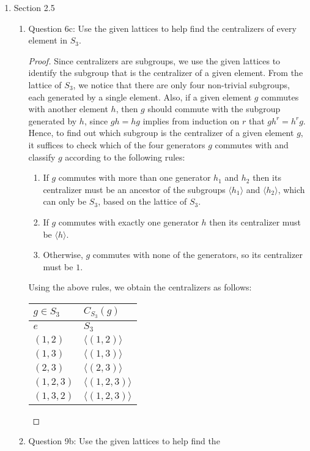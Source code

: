 \documentclass{article}
\begin{document}
\begin{enumerate}
  \item Section 2.5
    \begin{enumerate}
      \item Question 6c: Use the given lattices to help find the
        centralizers of every element in $S_3$.
        \begin{proof}
          Since centralizers are subgroups, we use the given lattices to
          identify the subgroup that is the centralizer of a given element.
          From the lattice of $S_3$, we notice that there are only four
          non-trivial subgroups, each generated by a single element. Also,
          if a given element $g$ commutes with another element $h$, then
          $g$ should commute with the subgroup generated by $h$, since
          $gh=hg$ implies from induction on $r$ that $gh^r=h^rg$. Hence, to
          find out which subgroup is the centralizer of a given element
          $g$, it suffices to check which of the four generators $g$
          commutes with and classify $g$ according to the following rules:
          \begin{enumerate}
            \item If $g$ commutes with more than one generator $h_1$ and
              $h_2$ then its centralizer must be an ancestor of the
              subgroups $\langle h_1\rangle$ and $\langle h_2\rangle$,
              which can only be $S_3$, based on the lattice of $S_3$.
            \item If $g$ commutes with exactly one generator $h$ then its
              centralizer must be $\langle h\rangle$.
            \item Otherwise, $g$ commutes with none of the generators, so
              its centralizer must be $1$.
          \end{enumerate}

          Using the above rules, we obtain the centralizers as follows:
          \begin{center}
            \begin{tabular}{|l|l|}
              \hline
              $g\in S_3$  & $C_{S_3}(g)$              \\ \hline\hline
              $e$         & $S_3$                     \\ \hline
              $(1,2)$     & $\langle(1,2)\rangle$     \\ \hline
              $(1,3)$     & $\langle(1,3)\rangle$     \\ \hline
              $(2,3)$     & $\langle(2,3)\rangle$     \\ \hline
              $(1,2,3)$   & $\langle(1,2,3)\rangle$   \\ \hline
              $(1,3,2)$   & $\langle(1,2,3)\rangle$   \\ \hline
            \end{tabular}
          \end{center}
        \end{proof}

      \item Question 9b: Use the given lattices to help find the
    \end{enumerate}
\end{enumerate}
\end{document}
